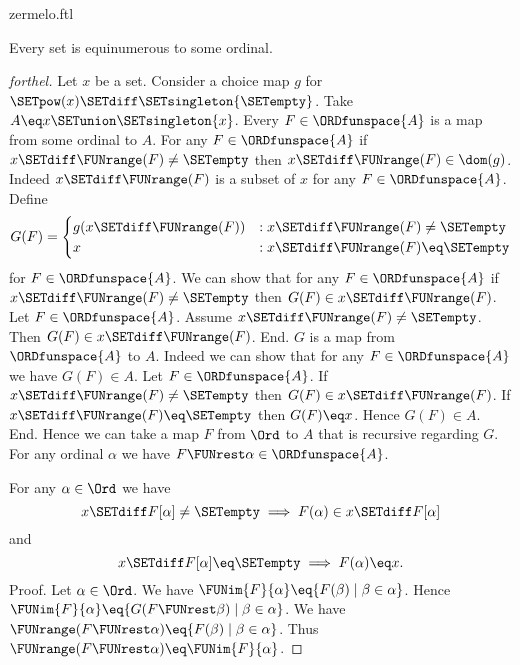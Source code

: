 \documentclass{naproche-library}
\begin{document}
\begin{smodule}[title=Zermelo's Well-Ordering Theorem]{zermelo.ftl}

\begin{theorem}[forthel,title=Zermelo's Well-Ordering Theorem,id=zermelo]
  Every set is equinumerous to some ordinal.
\end{theorem}
\begin{proof}[forthel]
  Let $x$ be a set.
  Consider a choice map $g$ for $\SETpow(x) \SETdiff \SETsingleton{\SETempty}$.
  Take $A \eq x \SETunion \SETsingleton{x}$.
  Every $F \in \ORDfunspace{A}$ is a map from some ordinal to $A$.
  For any $F \in \ORDfunspace{A}$ if $x \SETdiff \FUNrange(F) \neq \SETempty$ then $x \SETdiff \FUNrange(F) \in \dom(g)$.
  Indeed $x \SETdiff \FUNrange(F)$ is a subset of $x$ for any $F \in \ORDfunspace{A}$.
  Define \[ G(F) =
    \begin{cases}
      g(x \SETdiff \FUNrange(F))
      & : x \SETdiff \FUNrange(F) \neq \SETempty
      \\
      x
      & : x \SETdiff \FUNrange(F) \eq \SETempty
    \end{cases} \]
  for $F \in \ORDfunspace{A}$.
  We can show that for any $F \in \ORDfunspace{A}$ if $x \SETdiff \FUNrange(F) \neq \SETempty$ then $G(F) \in x \SETdiff \FUNrange(F)$.
    Let $F \in \ORDfunspace{A}$.
    Assume $x \SETdiff \FUNrange(F) \neq \SETempty$.  
    Then $G(F) \in x \SETdiff \FUNrange(F)$.
  End.
  $G$ is a map from $\ORDfunspace{A}$ to $A$.
  Indeed we can show that for any $F \in \ORDfunspace{A}$ we have $G(F) \in A$.
    Let $F \in \ORDfunspace{A}$.
    If $x \SETdiff \FUNrange(F) \neq \SETempty$ then $G(F) \in x \SETdiff \FUNrange(F)$.
    If $x \SETdiff \FUNrange(F) \eq \SETempty$ then $G(F) \eq x$.
    Hence $G(F) \in A$.
  End.
  Hence we can take a map $F$ from $\Ord$ to $A$ that is recursive regarding $G$.
  For any ordinal $\alpha$ we have $F \FUNrest \alpha \in \ORDfunspace{A}$.

  For any $\alpha \in \Ord$ we have
  \[ x \SETdiff F[\alpha] \neq \SETempty \implies F(\alpha) \in x \SETdiff F[\alpha] \]
  and
  \[ x \SETdiff F[\alpha] \eq \SETempty \implies F(\alpha) \eq x. \]
  Proof.
    Let $\alpha \in \Ord$.
    We have $\FUNim{F}{\alpha} \eq \{ F(\beta) \mid \beta \in \alpha \}$.
    Hence $\FUNim{F}{\alpha} \eq \{ G(F \FUNrest \beta) \mid \beta \in \alpha \}$.
    We have $\FUNrange(F \FUNrest \alpha) \eq \{ F(\beta) \mid \beta \in \alpha \}$.
    Thus $\FUNrange(F \FUNrest \alpha) \eq \FUNim{F}{\alpha}$.


\end{proof}
\end{smodule}
\end{document}
